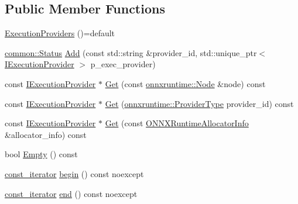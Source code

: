 \subsection*{Public Member Functions}
\begin{DoxyCompactItemize}
\item 
\mbox{\hyperlink{classonnxruntime_1_1ExecutionProviders_a52b3a1bd0ae86e36699450a2c79f2775}{Execution\+Providers}} ()=default
\item 
\mbox{\hyperlink{classonnxruntime_1_1common_1_1Status}{common\+::\+Status}} \mbox{\hyperlink{classonnxruntime_1_1ExecutionProviders_a9e714cc865dbb18293020db7a372bb89}{Add}} (const std\+::string \&provider\+\_\+id, std\+::unique\+\_\+ptr$<$ \mbox{\hyperlink{classonnxruntime_1_1IExecutionProvider}{I\+Execution\+Provider}} $>$ p\+\_\+exec\+\_\+provider)
\item 
const \mbox{\hyperlink{classonnxruntime_1_1IExecutionProvider}{I\+Execution\+Provider}} $\ast$ \mbox{\hyperlink{classonnxruntime_1_1ExecutionProviders_a41c2494ae4373f44ebf8f98f83e293cc}{Get}} (const \mbox{\hyperlink{classonnxruntime_1_1Node}{onnxruntime\+::\+Node}} \&node) const
\item 
const \mbox{\hyperlink{classonnxruntime_1_1IExecutionProvider}{I\+Execution\+Provider}} $\ast$ \mbox{\hyperlink{classonnxruntime_1_1ExecutionProviders_a9545ef8343f02280aa5871579576c8ba}{Get}} (\mbox{\hyperlink{namespaceonnxruntime_a863e2227cbf32aab76aad35fdadff4bb}{onnxruntime\+::\+Provider\+Type}} provider\+\_\+id) const
\item 
const \mbox{\hyperlink{classonnxruntime_1_1IExecutionProvider}{I\+Execution\+Provider}} $\ast$ \mbox{\hyperlink{classonnxruntime_1_1ExecutionProviders_a65c0368906fb2431bffe5a81fb5ea5b2}{Get}} (const \mbox{\hyperlink{structONNXRuntimeAllocatorInfo}{O\+N\+N\+X\+Runtime\+Allocator\+Info}} \&allocator\+\_\+info) const
\item 
bool \mbox{\hyperlink{classonnxruntime_1_1ExecutionProviders_a9294aa2a1de0a08b678adbd614b3a3b1}{Empty}} () const
\item 
\mbox{\hyperlink{classonnxruntime_1_1ExecutionProviders_a2eb06c44e805e428aa26b1bfe12348fb}{const\+\_\+iterator}} \mbox{\hyperlink{classonnxruntime_1_1ExecutionProviders_a38333c56526aab3fa4686eb6f8f9db26}{begin}} () const noexcept
\item 
\mbox{\hyperlink{classonnxruntime_1_1ExecutionProviders_a2eb06c44e805e428aa26b1bfe12348fb}{const\+\_\+iterator}} \mbox{\hyperlink{classonnxruntime_1_1ExecutionProviders_a7ef8bcdee18b9ff7e59141171cb79ed3}{end}} () const noexcept
\end{DoxyCompactItemize}


